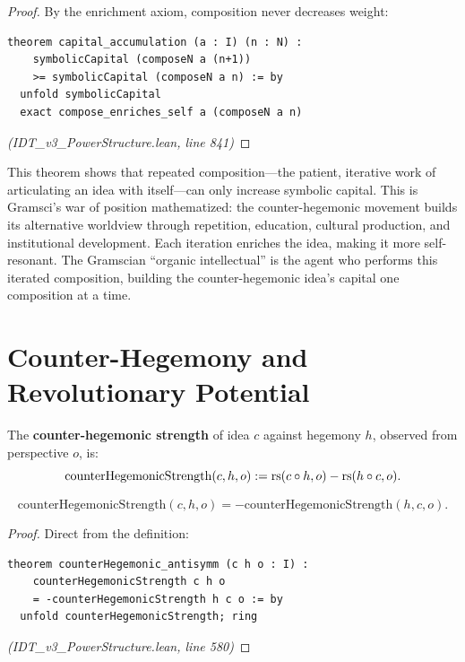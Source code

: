 \begin{proof}
By the enrichment axiom, composition never decreases weight:
\begin{lstlisting}
theorem capital_accumulation (a : I) (n : N) :
    symbolicCapital (composeN a (n+1))
    >= symbolicCapital (composeN a n) := by
  unfold symbolicCapital
  exact compose_enriches_self a (composeN a n)
\end{lstlisting}
\textit{(IDT\_v3\_PowerStructure.lean, line 841)}
\end{proof}

\begin{interpretation}
This theorem shows that repeated composition---the patient, iterative work of
articulating an idea with itself---can only increase symbolic capital. This is
Gramsci's war of position mathematized: the counter-hegemonic movement builds
its alternative worldview through repetition, education, cultural production,
and institutional development. Each iteration enriches the idea, making it
more self-resonant. The Gramscian ``organic intellectual'' is the agent who
performs this iterated composition, building the counter-hegemonic idea's
capital one composition at a time.
\end{interpretation}

\section{Counter-Hegemony and Revolutionary Potential}

\begin{definition}
\label{def:counter-hegemonic}
The \textbf{counter-hegemonic strength} of idea $c$ against hegemony $h$,
observed from perspective $o$, is:
\[
  \mathrm{counterHegemonicStrength}(c, h, o) := \mathrm{rs}(c \circ h, o) - \mathrm{rs}(h \circ c, o).
\]
\end{definition}

\begin{theorem}
\label{thm:counterhegemonic-antisymm}
\[
  \mathrm{counterHegemonicStrength}(c, h, o) = -\mathrm{counterHegemonicStrength}(h, c, o).
\]
\end{theorem}

\begin{proof}
Direct from the definition:
\begin{lstlisting}
theorem counterHegemonic_antisymm (c h o : I) :
    counterHegemonicStrength c h o
    = -counterHegemonicStrength h c o := by
  unfold counterHegemonicStrength; ring
\end{lstlisting}
\textit{(IDT\_v3\_PowerStructure.lean, line 580)}
\end{proof}


